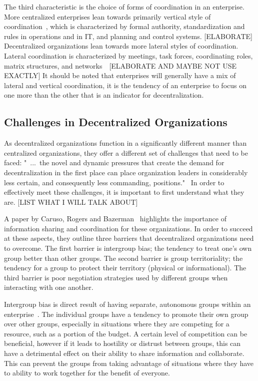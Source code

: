 The third characteristic is the choice of forms of coordination in an enterprise. More centralized enterprises lean towards primarily vertical style of coordination~\cite{Bolman2008}, which is characterized by formal authority, standardization and rules in operations and in IT, and planning and control systems. [ELABORATE] Decentralized organizations lean towards more lateral styles of coordination. Lateral coordination is characterized by meetings, task forces, coordinating roles, matrix structures, and networks~~\cite{Bolman2008}[ELABORATE AND MAYBE NOT USE EXACTLY] It should be noted that enterprises will generally have a mix of lateral and vertical coordination, it is the tendency of an enterprise to focus on one more than the other that is an indicator for decentralization. 

\subsection{Challenges in Decentralized Organizations}

As decentralized organizations function in a significantly different manner than centralized organizations, they offer a different set of challenges that need to be faced: "~...~the novel and dynamic pressures that create the demand for decentralization in the first place can place organization leaders in considerably less certain, and consequently less commanding, positions."~\cite{caruso2008boundaries} In order to effectively meet these challenges, it is important to first understand what they are. [LIST WHAT I WILL TALK ABOUT]

A paper by Caruso, Rogers and Bazerman~\cite{caruso2008boundaries} highlights the importance of information sharing and coordination for these organizations. In order to succeed at these aspects, they outline three barriers that decentralized organizations need to overcome. The first barrier is intergroup bias; the tendency to treat one's own group better than other groups. The second barrier is group territoriality; the tendency for a group to protect their territory (physical or informational). The third barrier is poor negotiation strategies used by different groups when interacting with one another. 

Intergroup bias is direct result of having separate, autonomous groups within an enterprise~\cite{caruso2008boundaries}. The individual groups have a tendency to promote their own group over other groups, especially in situations where they are competing for a resource, such as a portion of the budget. A certain level of competition can be beneficial, however if it leads to hostility or distrust between groups, this can have a detrimental effect on their ability to share information and collaborate. This can prevent the groups from taking advantage of situations where they have to ability to work together for the benefit of everyone. 

